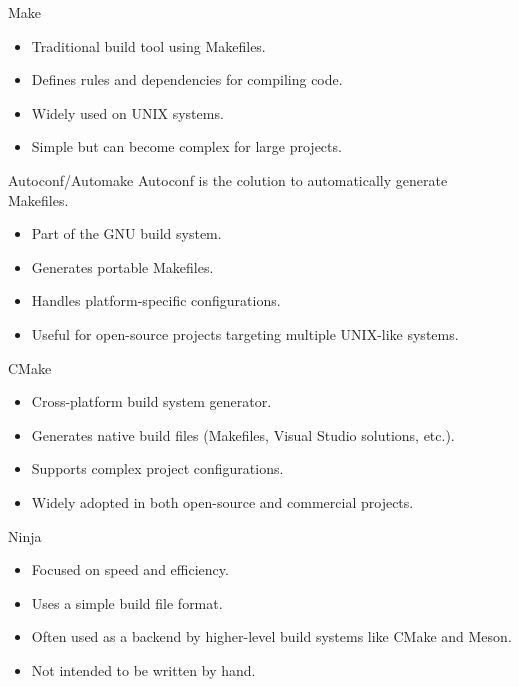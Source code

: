 \documentclass{beamer}
\begin{document}
\begin{frame}{Make}
  \begin{itemize}
    \item Traditional build tool using Makefiles.
    \item Defines rules and dependencies for compiling code.
    \item Widely used on UNIX systems.
    \item Simple but can become complex for large projects.
  \end{itemize}
\end{frame}

\begin{frame}{Autoconf/Automake}
  Autoconf is the colution to automatically generate Makefiles.
  \begin{itemize}
    \item Part of the GNU build system.
    \item Generates portable Makefiles.
    \item Handles platform-specific configurations.
    \item Useful for open-source projects targeting multiple UNIX-like systems.
  \end{itemize}
\end{frame}

\begin{frame}{CMake}
  \begin{itemize}
    \item Cross-platform build system generator.
    \item Generates native build files (Makefiles, Visual Studio solutions, etc.).
    \item Supports complex project configurations.
    \item Widely adopted in both open-source and commercial projects.
  \end{itemize}
\end{frame}

\begin{frame}{Ninja}
  \begin{itemize}
    \item Focused on speed and efficiency.
    \item Uses a simple build file format.
    \item Often used as a backend by higher-level build systems like CMake and Meson.
    \item Not intended to be written by hand.
  \end{itemize}
\end{frame}
\end{document}
